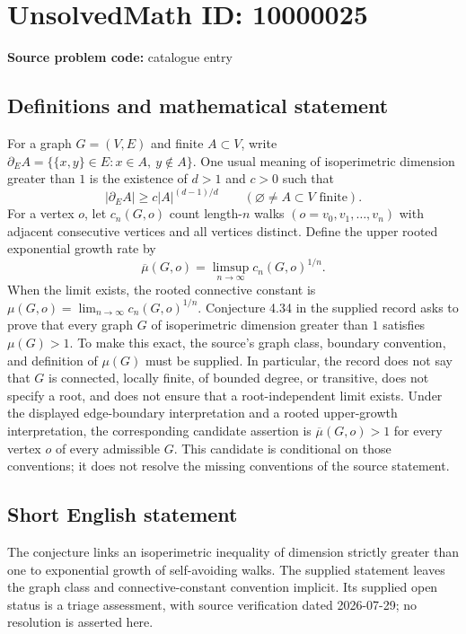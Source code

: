 \documentclass[11pt]{article}
\begin{document}
\section*{UnsolvedMath ID: 10000025}
\textbf{Source problem code:} catalogue entry
\subsection{Definitions and mathematical statement}
For a graph \(G=(V,E)\) and finite \(A\subset V\), write \(\partial_E A=\{\{x,y\}\in E:x\in A,\ y\notin A\}\). One usual meaning of isoperimetric dimension greater than \(1\) is the existence of \(d>1\) and \(c>0\) such that
\[
 |\partial_E A|\ge c|A|^{(d-1)/d}\qquad(\varnothing\ne A\subset V\text{ finite}).
\]
For a vertex \(o\), let \(c_n(G,o)\) count length-\(n\) walks \((o=v_0,v_1,\ldots,v_n)\) with adjacent consecutive vertices and all vertices distinct. Define the upper rooted exponential growth rate by
\[
 \overline\mu(G,o)=\limsup_{n\to\infty}c_n(G,o)^{1/n}.
\]
When the limit exists, the rooted connective constant is \(\mu(G,o)=\lim_{n\to\infty}c_n(G,o)^{1/n}\). Conjecture 4.34 in the supplied record asks to prove that every graph \(G\) of isoperimetric dimension greater than \(1\) satisfies \(\mu(G)>1\). To make this exact, the source's graph class, boundary convention, and definition of \(\mu(G)\) must be supplied. In particular, the record does not say that \(G\) is connected, locally finite, of bounded degree, or transitive, does not specify a root, and does not ensure that a root-independent limit exists. Under the displayed edge-boundary interpretation and a rooted upper-growth interpretation, the corresponding candidate assertion is \(\overline\mu(G,o)>1\) for every vertex \(o\) of every admissible \(G\). This candidate is conditional on those conventions; it does not resolve the missing conventions of the source statement.
\subsection{Short English statement}
The conjecture links an isoperimetric inequality of dimension strictly greater than one to exponential growth of self-avoiding walks. The supplied statement leaves the graph class and connective-constant convention implicit. Its supplied open status is a triage assessment, with source verification dated 2026-07-29; no resolution is asserted here.
\end{document}
